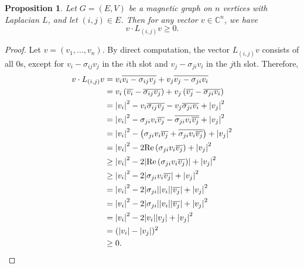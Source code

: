 \documentclass[12pt]{article}
\newtheorem{prop}[thm]{Proposition}
\theoremstyle{definition}
\newcommand{\C}{\mathbb C}
\DeclarePairedDelimiter\abs{\lvert}{\rvert}%
\begin{document}
\begin{prop}\label{contributions to Laplacian are positive semi-definite}
Let $G=(E, V)$ be a magnetic graph on $n$ vertices with Laplacian $L$, and let $(i, j) \in E$. Then for any vector $v \in \C^n$, we have 
$$v \cdot L_{(i,j)} v \geq 0.$$
\end{prop}
\begin{proof}
Let $v = (v_1, \dots, v_n)$. By direct computation, the vector $L_{(i,j)}v$ consists of all 0s, except for $v_i-\sigma_{ij}v_j$ in the $i$th slot and $v_j-\sigma_{ji}v_i$ in the $j$th slot. Therefore,
\begin{align*}
v \cdot L_{(i,j)} v &= v_i \overline{v_i-\sigma_{ij}v_j} + v_j \overline{v_j-\sigma_{ji}v_i} \\
&= v_i \left(\overline{v_i} - \overline{\sigma_{ij}}\overline{v_j}\right) + v_j \left(\overline{v_j} - \overline{\sigma_{ji}}\overline{v_i}\right) \\
&= \abs*{v_i}^2 - v_i\overline{\sigma_{ij}}\overline{v_j} - v_j\overline{\sigma_{ji}}\overline{v_i} + \abs*{v_j}^2 \\
&= \abs*{v_i}^2 - \sigma_{ji}v_i\overline{v_j} - \overline{\sigma_{ji}v_i\overline{v_j}} + \abs*{v_j}^2 \\
&= \abs*{v_i}^2 - \left(\sigma_{ji}v_i\overline{v_j} + \overline{\sigma_{ji}v_i\overline{v_j}}\right) + \abs*{v_j}^2 \\
&= \abs*{v_i}^2 - 2 \mathrm{Re}\left(\sigma_{ji}v_i\overline{v_j}\right) + \abs*{v_j}^2 \\
&\geq \abs*{v_i}^2 - 2 \abs*{\mathrm{Re}\left(\sigma_{ji}v_i\overline{v_j}\right)} + \abs*{v_j}^2 \\
&\geq \abs*{v_i}^2 - 2 \abs*{\sigma_{ji}v_i\overline{v_j}} + \abs*{v_j}^2 \\
&= \abs*{v_i}^2 - 2 \abs*{\sigma_{ji}}\abs*{v_i}\abs*{\overline{v_j}} + \abs*{v_j}^2 \\
&= \abs*{v_i}^2 - 2 \abs*{\sigma_{ji}}\abs*{v_i}\abs*{\overline{v_j}} + \abs*{v_j}^2 \\
&= \abs*{v_i}^2 - 2 \abs*{v_i}\abs*{v_j} + \abs*{v_j}^2 \\
&= (\abs*{v_i} - \abs*{v_j})^2 \\
&\geq 0.
\end{align*}
\end{proof}
\end{document}
